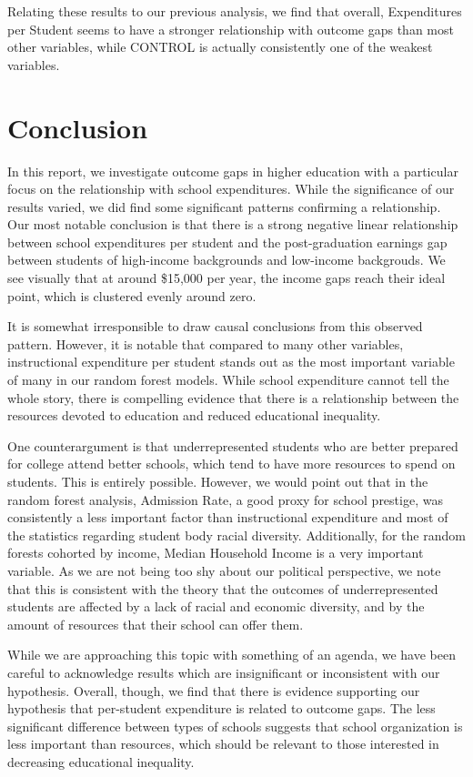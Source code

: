 \documentclass{article}
\begin{document}
Relating these results to our previous analysis, we find that overall, Expenditures per Student seems to have a stronger relationship with outcome gaps than most other variables, while CONTROL is actually consistently one of the weakest variables. 



\section{Conclusion}

In this report, we investigate outcome gaps in higher education with a particular focus on the relationship with school expenditures. While the significance of our results varied, we did find some significant patterns confirming a relationship. Our most notable conclusion is that there is a strong negative linear relationship between school expenditures per student and the post-graduation earnings gap between students of high-income backgrounds and low-income backgrouds. We see visually that at around \$15,000 per year, the income gaps reach their ideal point, which is clustered evenly around zero. 

It is somewhat irresponsible to draw causal conclusions from this observed pattern. However, it is notable that compared to many other variables, instructional expenditure per student stands out as the most important variable of many in our random forest models. While school expenditure cannot tell the whole story, there is compelling evidence that there is a relationship between the resources devoted to education and reduced educational inequality. 

One counterargument is that underrepresented students who are better prepared for college attend better schools, which tend to have more resources to spend on students. This is entirely possible. However, we would point out that in the random forest analysis, Admission Rate, a good proxy for school prestige, was consistently a less important factor than instructional expenditure and most of the statistics regarding student body racial diversity. Additionally, for the random forests cohorted by income, Median Household Income is a very important variable. As we are not being too shy about our political perspective, we note that this is consistent with the theory that the outcomes of underrepresented students are affected by a lack of racial and economic diversity, and by the amount of resources that their school can offer them.

While we are approaching this topic with something of an agenda, we have been careful to acknowledge results which are insignificant or inconsistent with our hypothesis. Overall, though, we find that there is evidence supporting our hypothesis that per-student expenditure is related to outcome gaps. The less significant difference between types of schools suggests that school organization is less important than resources, which should be relevant to those interested in decreasing educational inequality.
\end{document}
